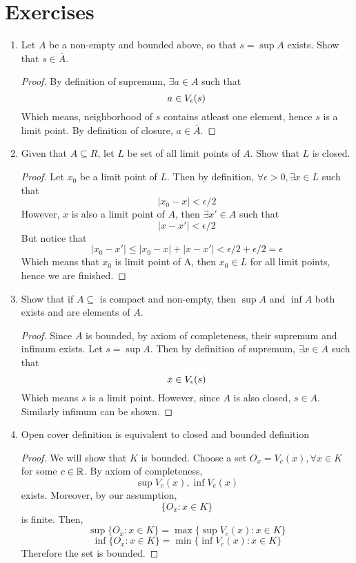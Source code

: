 \section{Exercises}
\begin{enumerate}
    \item Let $A$ be a non-empty and bounded above, so that $s = \sup A$ exists. Show that $s \in \overline{A}$.
        \begin{proof}
            By definition of supremum, $\exists a \in A$ such that
            \[ a \in V_{\epsilon}(s)\]
            Which means, neighborhood of $s$ contains atleast one element, hence $s$ is a limit point. By definition of closure, $a \in \overline{A}$.
        \end{proof}
    \item  Given that $A \subseteq R$, let $L$ be set of all limit points of $A$. Show that $L$ is closed.
        \begin{proof}
            Let $x_0$ be a limit point of $L$. Then by definition, $\forall \epsilon > 0, \exists x \in L$ such that
            \[ |x_0 - x| < \epsilon/2\]
            However, $x$ is also a limit point of $A$, then $\exists x' \in A$ such that
            \[ |x - x'| < \epsilon/2\]
            But notice that
            \[ |x_0 - x'| \le |x_0 - x| + |x - x'| < \epsilon/2 + \epsilon/2 = \epsilon\]
            Which means that $x_0$ is limit point of A, then $x_0 \in L$ for all limit points, hence we are finished.
        \end{proof}
    \item Show that if $A \subseteq$ is compact and non-empty, then $\sup A$ and $\inf A$ both exists and are elements of $A$.
        \begin{proof}
            Since $A$ is bounded, by axiom of completeness, their supremum and infimum exists. Let $s = \sup A$. Then by definition of supremum, $ \exists x \in A$ such that
            \[ x \in V_{\epsilon}(s)\]
            Which means $s$ is a limit point. However, since $A$ is also closed, $s \in A$. Similarly infimum can be shown.
        \end{proof}
    \item Open cover definition is equivalent to closed and bounded definition
    \begin{proof}
        We will show that $K$ is bounded.
        Choose a set $O_x = V_{c}(x),\forall x \in K$ for some $c \in {\mathbb{R}}$. By axiom of completeness,
        \[ \sup V_c(x), \inf V_c(x)\]
        exists. Moreover, by our assumption,
        \[ \{ O_x : x \in K\}\]
        is finite. Then,
        \[\sup \{ O_x : x \in K\} = \max \{ \sup V_c(x) : x \in K \} \]
        \[\inf \{ O_x : x \in K\} = \min \{ \inf V_c(x) : x \in K \} \]
        Therefore the set is bounded.


\end{proof}
\end{enumerate}

